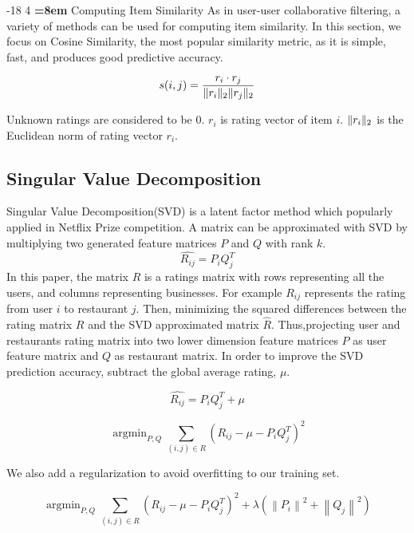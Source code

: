 \documentclass{llncs}
\makeatletter
\DeclarePairedDelimiter{\norm}{\lVert}{\rVert}
\DeclareMathOperator*{\argmin}{argmin}
\renewcommand\subsubsection{\@startsection{subsubsection}{3}{\z@}%
	{-18\p@ \@plus -4\p@ \@minus -4\p@}%
	{4\p@ \@plus 2\p@ \@minus 2\p@}%
	{\normalfont\normalsize\bfseries\boldmath
		\rightskip=\z@ \@plus 8em\pretolerance=10000 }}
\makeatother
\begin{document}
\subsubsection{Computing Item Similarity}
As in user-user collaborative filtering, a variety of methods can be used for computing item similarity. In this section, we focus on Cosine Similarity, the most popular similarity metric, as it is simple, fast, and produces good predictive accuracy. 

\begin{equation}
s(i,j) = \frac{r_{i}\cdot r_{j}}{\norm {r_{i}}_{2} \norm {r_{j}}_{2}}
\end{equation}

Unknown ratings are considered to be 0. $r_{i}$ is rating vector of item $i$. $\norm {r_{i}}_{2}$ is the Euclidean norm of rating vector $r_{i}$.

\subsection{Singular Value Decomposition}
Singular Value Decomposition(SVD) is a latent factor method which popularly applied in Netflix Prize competition. A matrix can be approximated with SVD by multiplying two generated feature matrices $P$ and $Q$ with rank $k$.
\begin{equation}
\hat{R_{ij}} = P_iQ_{j}^{T}
\end{equation}
In this paper, the matrix $R$ is a ratings matrix with rows representing all the users, and columns representing businesses. For example $R_{ij}$ represents the rating from user $i$ to restaurant $j$. Then, minimizing the squared differences between the rating matrix $R$ and the SVD approximated matrix $\hat{R}$. Thus,projecting user and restaurants rating matrix into two lower dimension feature matrices $P$ as user feature matrix and $Q$ as restaurant matrix. In order to improve the SVD prediction accuracy, subtract the global average rating, $\mu$.

\begin{equation}
\hat{R_{ij}} = P_iQ_{j}^{T} + \mu
\end{equation}

\begin{equation}
\argmin_{P,Q}\sum_{(i,j)\in{R}}{(R_{ij} - \mu - P_iQ_{j}^{T})}^2
\end{equation}

We also add a regularization to avoid overfitting to our training set.

\begin{equation}
\argmin_{P,Q}\sum_{(i,j)\in{R}}{(R_{ij} - \mu - P_iQ_{j}^{T})}^2 + \lambda({\left\|P_i\right\|}^2 + {\left\|Q_j\right\|}^2 )
\end{equation}
\end{document}
